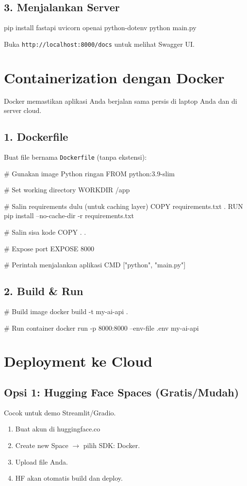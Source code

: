 \subsection{3. Menjalankan Server}
\begin{codeblock}
pip install fastapi uvicorn openai python-dotenv
python main.py
\end{codeblock}
Buka \texttt{http://localhost:8000/docs} untuk melihat Swagger UI.

\section{Containerization dengan Docker}

Docker memastikan aplikasi Anda berjalan sama persis di laptop Anda dan di server cloud.

\subsection{1. Dockerfile}
Buat file bernama \texttt{Dockerfile} (tanpa ekstensi):

\begin{codeblock}
# Gunakan image Python ringan
FROM python:3.9-slim

# Set working directory
WORKDIR /app

# Salin requirements dulu (untuk caching layer)
COPY requirements.txt .
RUN pip install --no-cache-dir -r requirements.txt

# Salin sisa kode
COPY . .

# Expose port
EXPOSE 8000

# Perintah menjalankan aplikasi
CMD ["python", "main.py"]
\end{codeblock}

\subsection{2. Build \& Run}
\begin{codeblock}
# Build image
docker build -t my-ai-api .

# Run container
docker run -p 8000:8000 --env-file .env my-ai-api
\end{codeblock}

\section{Deployment ke Cloud}

\subsection{Opsi 1: Hugging Face Spaces (Gratis/Mudah)}
Cocok untuk demo Streamlit/Gradio.
\begin{enumerate}
    \item Buat akun di huggingface.co
    \item Create new Space $\rightarrow$ pilih SDK: Docker.
    \item Upload file Anda.
    \item HF akan otomatis build dan deploy.
\end{enumerate}


